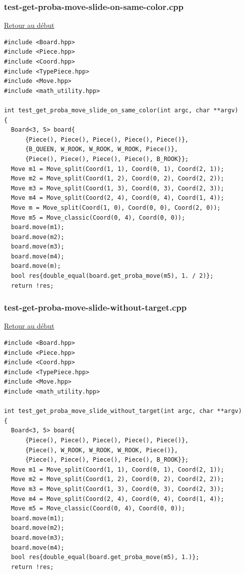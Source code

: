 {\begin{frame}[fragile]
\begin{verbatim}
\end{verbatim}
\end{frame}

\begin{frame}[fragile]
\label{testgetprobamoveslideonsamecolor.cpp}
\frametitle{test-get-proba-move-slide-on-same-color.cpp}
\hyperlink{conclusion}{Retour au début}\newline
\begin{verbatim}
#include <Board.hpp>
#include <Piece.hpp>
#include <Coord.hpp>
#include <TypePiece.hpp>
#include <Move.hpp>
#include <math_utility.hpp>

int test_get_proba_move_slide_on_same_color(int argc, char **argv)
{
  Board<3, 5> board{
      {Piece(), Piece(), Piece(), Piece(), Piece()},
      {B_QUEEN, W_ROOK, W_ROOK, W_ROOK, Piece()},
      {Piece(), Piece(), Piece(), Piece(), B_ROOK}};
  Move m1 = Move_split(Coord(1, 1), Coord(0, 1), Coord(2, 1));
  Move m2 = Move_split(Coord(1, 2), Coord(0, 2), Coord(2, 2));
  Move m3 = Move_split(Coord(1, 3), Coord(0, 3), Coord(2, 3));
  Move m4 = Move_split(Coord(2, 4), Coord(0, 4), Coord(1, 4));
  Move m = Move_split(Coord(1, 0), Coord(0, 0), Coord(2, 0));
  Move m5 = Move_classic(Coord(0, 4), Coord(0, 0));
  board.move(m1);
  board.move(m2);
  board.move(m3);
  board.move(m4);
  board.move(m);
  bool res{double_equal(board.get_proba_move(m5), 1. / 2)};
  return !res;

\end{verbatim}
\end{frame}

\begin{frame}[fragile]
\label{testgetprobamoveslidewithouttarget.cpp}
\frametitle{test-get-proba-move-slide-without-target.cpp}
\hyperlink{conclusion}{Retour au début}\newline
\begin{verbatim}
#include <Board.hpp>
#include <Piece.hpp>
#include <Coord.hpp>
#include <TypePiece.hpp>
#include <Move.hpp>
#include <math_utility.hpp>

int test_get_proba_move_slide_without_target(int argc, char **argv)
{
  Board<3, 5> board{
      {Piece(), Piece(), Piece(), Piece(), Piece()},
      {Piece(), W_ROOK, W_ROOK, W_ROOK, Piece()},
      {Piece(), Piece(), Piece(), Piece(), B_ROOK}};
  Move m1 = Move_split(Coord(1, 1), Coord(0, 1), Coord(2, 1));
  Move m2 = Move_split(Coord(1, 2), Coord(0, 2), Coord(2, 2));
  Move m3 = Move_split(Coord(1, 3), Coord(0, 3), Coord(2, 3));
  Move m4 = Move_split(Coord(2, 4), Coord(0, 4), Coord(1, 4));
  Move m5 = Move_classic(Coord(0, 4), Coord(0, 0));
  board.move(m1);
  board.move(m2);
  board.move(m3);
  board.move(m4);
  bool res{double_equal(board.get_proba_move(m5), 1.)};
  return !res;


\end{verbatim}
\end{frame}}
